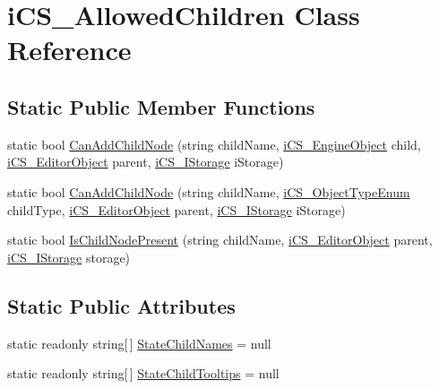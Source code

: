 \hypertarget{classi_c_s___allowed_children}{\section{i\+C\+S\+\_\+\+Allowed\+Children Class Reference}
\label{classi_c_s___allowed_children}
}
\subsection*{Static Public Member Functions}
\begin{DoxyCompactItemize}
\item 
static bool \hyperlink{classi_c_s___allowed_children_adb848e37d901e37e465aa798efaf7460}{Can\+Add\+Child\+Node} (string child\+Name, \hyperlink{classi_c_s___engine_object}{i\+C\+S\+\_\+\+Engine\+Object} child, \hyperlink{classi_c_s___editor_object}{i\+C\+S\+\_\+\+Editor\+Object} parent, \hyperlink{classi_c_s___i_storage}{i\+C\+S\+\_\+\+I\+Storage} i\+Storage)
\item 
static bool \hyperlink{classi_c_s___allowed_children_a4c8fee2302ff4ce8ca78227d9e70e289}{Can\+Add\+Child\+Node} (string child\+Name, \hyperlink{i_c_s___object_type_enum_8cs_ae6c3dd6d8597380b56d94908eb431547}{i\+C\+S\+\_\+\+Object\+Type\+Enum} child\+Type, \hyperlink{classi_c_s___editor_object}{i\+C\+S\+\_\+\+Editor\+Object} parent, \hyperlink{classi_c_s___i_storage}{i\+C\+S\+\_\+\+I\+Storage} i\+Storage)
\item 
static bool \hyperlink{classi_c_s___allowed_children_a9767a686dad95487b32c38026dae0e61}{Is\+Child\+Node\+Present} (string child\+Name, \hyperlink{classi_c_s___editor_object}{i\+C\+S\+\_\+\+Editor\+Object} parent, \hyperlink{classi_c_s___i_storage}{i\+C\+S\+\_\+\+I\+Storage} storage)
\end{DoxyCompactItemize}
\subsection*{Static Public Attributes}
\begin{DoxyCompactItemize}
\item 
static readonly string\mbox{[}$\,$\mbox{]} \hyperlink{classi_c_s___allowed_children_a8d50fb40615edd8a6bd46dca7561fb84}{State\+Child\+Names} = null
\item 
static readonly string\mbox{[}$\,$\mbox{]} \hyperlink{classi_c_s___allowed_children_a672be128bd97fceabd66df730ea65aed}{State\+Child\+Tooltips} = null
\end{DoxyCompactItemize}


